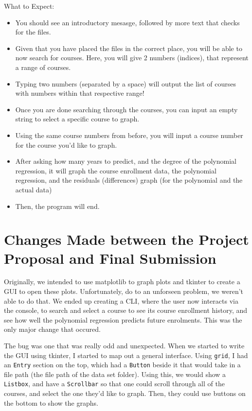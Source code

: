 \documentclass[fontsize=11pt]{article}
\begin{document}
What to Expect:
\begin{itemize}
    \item You should see an introductory mesasge, followed by more text that checks for the files.
    \item Given that you have placed the files in the correct place, you will be able to now
    search for courses. Here, you will give 2 numbers (indices), that represent a range of courses.
    \item Typing two numbers (separated by a space) will output the list of courses with numbers
    within that respective range!
    \item Once you are done searching through the courses, you can input an empty string
    to select a specific course to graph.
    \item Using the same course numbers from before, you will input a course number for
    the course you'd like to graph.
    \item After asking how many years to predict, and the degree of the polynomial regression,
    it will graph the course enrollment data, the polynomial regression, and the residuals (differences) graph
    (for the polynomial and the actual data)
    \item Then, the program will end.
\end{itemize}

\section*{Changes Made between the Project Proposal and Final Submission}

Originally, we intended to use matplotlib to graph plots and tkinter to create a GUI
to open these plots. Unfortunately, do to an unforseen problem, we weren't able to do that.
We ended up creating a CLI, where the user now interacts via the console, to search and select
a course to see its course enrollment history, and see how well the polynomial regression predicts future enrolments.
This was the only major change that occured.

The bug was one that was really odd and unexpected.
When we started to write the GUI using tkinter, I started to map out a general interface.
Using \texttt{grid}, I had an \texttt{Entry} section on the top, which had a \texttt{Button} beside it
that would take in a file path (the file path of the data set folder).
Using this, we would show a \texttt{Listbox}, and have a \texttt{Scrollbar}
so that one could scroll through all of the courses, and select the one they'd like to graph.
Then, they could use buttons on the bottom to show the graphs.
\end{document}
